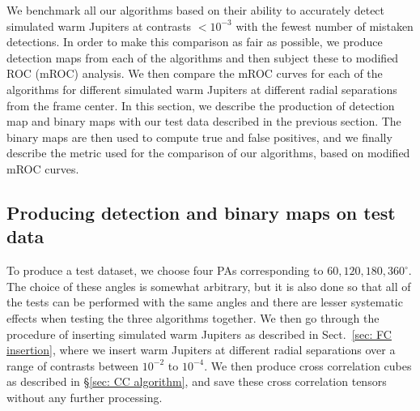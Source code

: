 \documentclass{aa}
\begin{document}
We benchmark all our algorithms based on their ability to accurately detect simulated warm Jupiters at contrasts $<10^{-3}$ with the fewest number of mistaken detections.
In order to make this comparison as fair as possible, we produce detection maps from each of the algorithms and then subject these to modified ROC (mROC) analysis.
We then compare the mROC curves for each of the algorithms for different simulated warm Jupiters at different radial separations from the frame center.
In this section, we describe the production of detection map and binary maps with our test data described in the previous section.
The binary maps are then used to compute true and false positives, and we finally describe the metric used for the comparison of our algorithms, based on modified mROC curves.


\subsection{Producing detection and binary maps on test data}\label{sec:testdata}

To produce a test dataset, we choose four PAs corresponding to $60,120,180,360^{\circ}$.
The choice of these angles is somewhat arbitrary, but it is also done so that all of the tests can be performed with the same angles and there are lesser systematic effects when testing the three algorithms together.
We then go through the procedure of inserting simulated warm Jupiters as described in Sect.~\ref{sec: FC insertion}, where we insert warm Jupiters at different radial separations over a range of contrasts between $10^{-2}$ to $10^{-4}$. We then produce cross correlation cubes as described in \S\ref{sec: CC algorithm}, and save these cross correlation tensors without any further processing.
\end{document}
